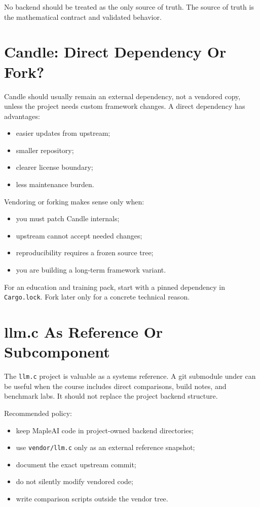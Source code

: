 No backend should be treated as the only source of truth. The source of truth is the
mathematical contract and validated behavior.

\section{Candle: Direct Dependency Or Fork?}

Candle should usually remain an external dependency, not a vendored copy, unless the
project needs custom framework changes. A direct dependency has advantages:

\begin{itemize}
  \item easier updates from upstream;
  \item smaller repository;
  \item clearer license boundary;
  \item less maintenance burden.
\end{itemize}

Vendoring or forking makes sense only when:

\begin{itemize}
  \item you must patch Candle internals;
  \item upstream cannot accept needed changes;
  \item reproducibility requires a frozen source tree;
  \item you are building a long-term framework variant.
\end{itemize}

For an education and training pack, start with a pinned dependency in \texttt{Cargo.lock}.
Fork later only for a concrete technical reason.

\section{llm.c As Reference Or Subcomponent}

The \texttt{llm.c} project is valuable as a systems reference. A git submodule under
 can be useful when the course includes direct comparisons, build
notes, and benchmark labs. It should not replace the project backend structure.

Recommended policy:

\begin{itemize}
  \item keep MapleAI code in project-owned backend directories;
  \item use \texttt{vendor/llm.c} only as an external reference snapshot;
  \item document the exact upstream commit;
  \item do not silently modify vendored code;
  \item write comparison scripts outside the vendor tree.
\end{itemize}

